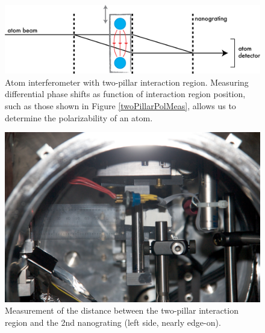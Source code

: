 \begin{figure}
\includegraphics[width=1\textwidth]{Figures/IFMpillarsTrans.png}
\caption[Atom interferometer with two-pillar interaction region]{\label{IFMpillarsTrans}Atom interferometer with two-pillar interaction region. Measuring differential phase shifts as function of interaction region position, such as those shown in Figure \ref{twoPillarPolMeas}, allows us to determine the polarizability of an atom.}
\end{figure}


\begin{figure}
\includegraphics[width=1\textwidth]{Figures/intRegionNew2gMeas.jpg}
\caption[Measurement of the distance between the two-pillar interaction region and the 2nd nanograting]{\label{newIntRegion2g}Measurement of the distance between the two-pillar interaction region and the 2nd nanograting (left side, nearly edge-on).}
\end{figure}



